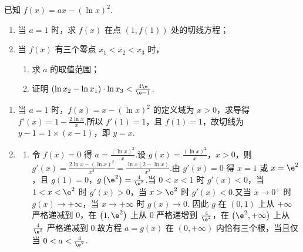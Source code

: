 \documentclass[UTF8,a4paper,oneside,11pt]{ctexbook}
\begin{document}
\begin{problem}
已知 \(f(x)=ax-(\ln x)^2\).
\begin{enumerate}
\item 当 \(a=1\) 时，求 \(f(x)\) 在点 \((1,f(1))\) 处的切线方程；
\item 当 \(f(x)\) 有三个零点 \(x_1<x_2<x_3\) 时，
\begin{enumerate}
    \item 求 \(a\) 的取值范围；
    \item 证明 \((\ln x_2-\ln x_1)\cdot \ln x_3<\frac{4\e}{\e-1}\).
\end{enumerate}
\end{enumerate}
\end{problem}

\begin{solution}
\begin{enumerate}
\item 当 \(a=1\) 时，\(f\left(x\right)=x-\left(\ln x\right)^2\) 的定义域为 \(x>0\)，求导得 \(f'\left(x\right)=1-\frac{2\ln x}{x}\).所以 \(f'\left(1\right)=1\)，且 \(f\left(1\right)=1\)，故切线为 \(y-1=1\times\left(x-1\right)\)，即 \(y=x\).
\item
\begin{enumerate}
\item 令 \(f\left(x\right)=0\) 得 \(a=\frac{\left(\ln x\right)^2}{x}\).设 \(g\left(x\right)=\frac{\left(\ln x\right)^2}{x}\)，\(x>0\)，则 \(g'\left(x\right)=\frac{2\ln x-\left(\ln x\right)^2}{x^2}=\frac{\ln x\left(2-\ln x\right)}{x^2}\).由 \(g'\left(x\right)=0\) 得 \(x=1\) 或 \(x=\e^2\)，且 \(g\left(1\right)=0\)，\(g\left(\e^2\right)=\frac{4}{\e^2}\).当 \(0<x<1\) 时 \(g'\left(x\right)<0\)，当 \(1<x<\e^2\) 时 \(g'\left(x\right)>0\)，当 \(x>\e^2\) 时 \(g'\left(x\right)<0\).又当 \(x\to 0^+\) 时 \(g\left(x\right)\to +\infty\)，当 \(x\to +\infty\) 时 \(g\left(x\right)\to 0\).
因此 \(g\) 在 \(\left(0,1\right)\) 上从 \(+\infty\) 严格递减到 \(0\)，在 \(\left(1,\e^2\right)\) 上从 \(0\) 严格递增到 \(\frac{4}{\e^2}\)，在 \(\left(\e^2,+\infty\right)\) 上从 \(\frac{4}{\e^2}\) 严格递减到 \(0\).故方程 \(a=g\left(x\right)\) 在 \(\left(0,+\infty\right)\) 内恰有三个根，当且仅当 \(0<a<\frac{4}{\e^2}\).

\end{enumerate}
\end{enumerate}
\end{solution}
\end{document}
